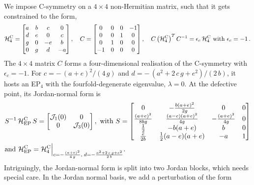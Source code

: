 \documentclass[aps, prb, onecolumn, nofootinbib, citeautoscript, 10pt]{revtex4-2}
\def \nn{\nonumber \\}
\begin{document}
We impose C-symmetry on a $4\times 4$ non-Hermitian matrix, such that it gets constrained to the form,
\begin{align}
\label{eqcdim4}
\mathcal H^{\rm C}_4 = \begin{bmatrix}
a & b & c & 0 \\
 d & e & 0 & c \\
 g & 0 & -e & b \\
 0 & g & d & -a \\
\end{bmatrix}, \quad
C =  \begin{bmatrix}
 0 & 0 & 0 & -1 \\
 0 & 0 & 1 & 0 \\
 0 & 1 & 0 & 0 \\
 -1 & 0 & 0 & 0 \\
\end{bmatrix},\quad
C \left( \mathcal H^{\rm C}_4 \right)^T C^{-1} = \epsilon_c  \, \mathcal H^{\rm C}_4 \text{ with } \epsilon_c = -1 \,.
\end{align}
The $4 \times 4 $ matrix $C$ forms a four-dimensional realisation of the C-symmetry with $\epsilon_c=-1$. 
For $ c = -\,(a+e)^2 /(4\, g) $ and $ d= -\,(a^2+2 \,c\, g+e^2)/(2 \,b)$, it hosts an EP$_4$ with the fourfold-degenerate eigenvalue, $\lambda = 0$. At the defective point, its Jordan-normal form is
\begin{align}
& S^{-1} \, {\mathcal H^{\rm C}_{\rm EP}} \, S =  \begin{bmatrix}
\mathcal J_1(0) & 0 \\
 0 & \mathcal J_3(0) \\
\end{bmatrix}, \text{ with }
S = \begin{bmatrix}
 0 & -\frac{b (a+e)^2}{2 g} & 0 & 0 \\
 \frac{(a+e)^2}{8 b g} & \frac{(a-e) (a+e)^2}{4 g} & -\frac{(a+e)^2}{4 g} & 0 \\
 \frac{1}{2} & -b (a+e) & b & 0 \\
 \frac{e}{2 b} & \frac{1}{2} (a-e) (a+e) & -a & 1 \\
\end{bmatrix} \nn
& \text{and }
{\mathcal H^{\rm C}_{\rm EP}}  = {\mathcal H^{\rm C}_4} 
\Big \vert_{c = -\frac{(a+e)^2}{4\, g},\; d = -\frac{a^2+2 \,c\, g+e^2}{2 \,b} }.
\end{align}
Intriguingly, the Jordan-normal form is split into two Jordan blocks, which needs special care. In the Jordan normal basis, we add a perturbation of the form
\end{document}
